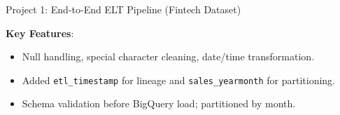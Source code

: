 \documentclass{beamer}
\begin{document}
\begin{frame}[shrink=10]{Project 1: End-to-End ELT Pipeline (Fintech Dataset)}
\begin{center}
{
  }
  \end{center}
  
  \vspace{0.1cm}
  \textbf{Key Features}:
  \begin{itemize}
    \item[\textcolor{RakutenCrimson}{\faCheckCircle}] Null handling, special character cleaning, date/time transformation.
    \item[\textcolor{RakutenCrimson}{\faCheckCircle}] Added \texttt{etl\_timestamp} for lineage and \texttt{sales\_yearmonth} for partitioning.
    \item[\textcolor{RakutenCrimson}{\faCheckCircle}] Schema validation before BigQuery load; partitioned by month.
  \end{itemize}
\end{frame}

\end{document}
